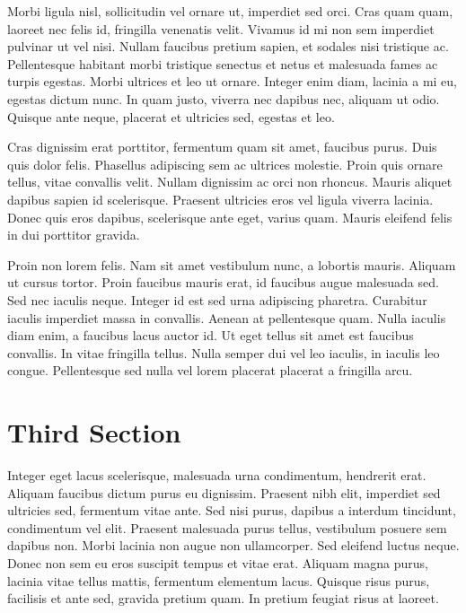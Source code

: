 Morbi ligula nisl, sollicitudin vel ornare ut, imperdiet sed orci. Cras quam quam, laoreet nec felis id, fringilla venenatis velit. Vivamus id mi non sem imperdiet pulvinar ut vel nisi. Nullam faucibus pretium sapien, et sodales nisi tristique ac. Pellentesque habitant morbi tristique senectus et netus et malesuada fames ac turpis egestas. Morbi ultrices et leo ut ornare. Integer enim diam, lacinia a mi eu, egestas dictum nunc. In quam justo, viverra nec dapibus nec, aliquam ut odio. Quisque ante neque, placerat et ultricies sed, egestas et leo.

Cras dignissim erat porttitor, fermentum quam sit amet, faucibus purus. Duis quis dolor felis. Phasellus adipiscing sem ac ultrices molestie. Proin quis ornare tellus, vitae convallis velit. Nullam dignissim ac orci non rhoncus. Mauris aliquet dapibus sapien id scelerisque. Praesent ultricies eros vel ligula viverra lacinia. Donec quis eros dapibus, scelerisque ante eget, varius quam. Mauris eleifend felis in dui porttitor gravida.

Proin non lorem felis. Nam sit amet vestibulum nunc, a lobortis mauris. Aliquam ut cursus tortor. Proin faucibus mauris erat, id faucibus augue malesuada sed. Sed nec iaculis neque. Integer id est sed urna adipiscing pharetra. Curabitur iaculis imperdiet massa in convallis. Aenean at pellentesque quam. Nulla iaculis diam enim, a faucibus lacus auctor id. Ut eget tellus sit amet est faucibus convallis. In vitae fringilla tellus. Nulla semper dui vel leo iaculis, in iaculis leo congue. Pellentesque sed nulla vel lorem placerat placerat a fringilla arcu.

\section{Third Section} %

Integer eget lacus scelerisque, malesuada urna condimentum, hendrerit erat. Aliquam faucibus dictum purus eu dignissim. Praesent nibh elit, imperdiet sed ultricies sed, fermentum vitae ante. Sed nisi purus, dapibus a interdum tincidunt, condimentum vel elit. Praesent malesuada purus tellus, vestibulum posuere sem dapibus non. Morbi lacinia non augue non ullamcorper. Sed eleifend luctus neque. Donec non sem eu eros suscipit tempus et vitae erat. Aliquam magna purus, lacinia vitae tellus mattis, fermentum elementum lacus. Quisque risus purus, facilisis et ante sed, gravida pretium quam. In pretium feugiat risus at laoreet.

